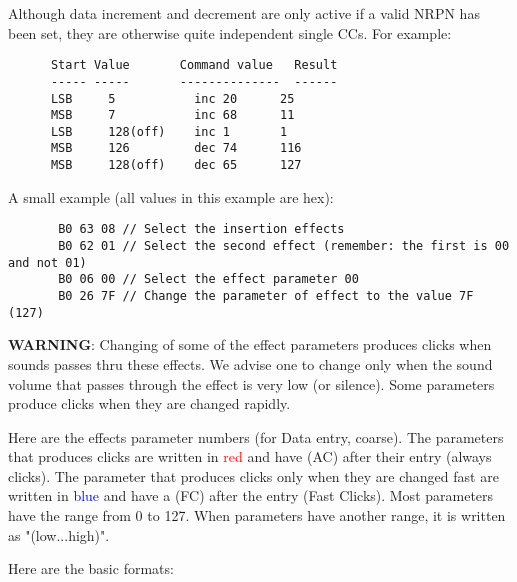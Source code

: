    Although data increment and decrement are only active if a valid NRPN has
   been set, they are otherwise quite independent single CCs.  For example:

   \begin{verbatim}
      Start Value       Command value   Result
      ----- -----       --------------  ------
      LSB     5           inc 20      25
      MSB     7           inc 68      11
      LSB     128(off)    inc 1       1
      MSB     126         dec 74      116
      MSB     128(off)    dec 65      127
   \end{verbatim}

   A small example (all values in this example are hex):

   \begin{verbatim}
       B0 63 08 // Select the insertion effects
       B0 62 01 // Select the second effect (remember: the first is 00 and not 01)
       B0 06 00 // Select the effect parameter 00
       B0 26 7F // Change the parameter of effect to the value 7F (127)
   \end{verbatim}

   \textbf{WARNING}:
   Changing of some of the effect parameters produces clicks when sounds
   passes thru these effects.  We advise one to change only when the sound
   volume that passes through the effect is very low (or silence).  Some
   parameters produce clicks when they are changed rapidly.

   Here are the effects parameter numbers (for Data entry, coarse).
   The parameters that produces clicks are written in \textcolor{red}{red}
   and have (AC) after their entry (always clicks).
   The parameter that produces clicks only when they are changed fast are
   written in \textcolor{blue}{blue} and have a (FC) after the entry (Fast
   Clicks).
   Most parameters have the range from 0 to 127.
   When parameters have another range, it is written as "(low...high)".

   Here are the basic formats:

